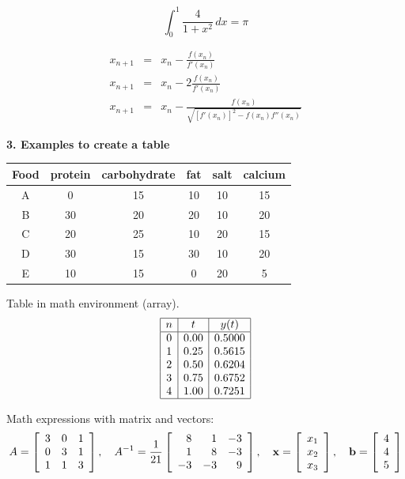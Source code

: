 \documentclass[12pt]{article}
\begin{document}
\begin{equation*}
\int_0^1 \frac{4}{1+x^2}\, dx = \pi
\end{equation*} 



\begin{eqnarray*}
x_{n+1} &= & x_n-\frac{f(x_n)}{f'(x_n)}\\
x_{n+1} &=& x_n-2\frac{f(x_n)}{f'(x_n)}\\
x_{n+1} &=& x_n-\frac{f(x_n)}{\sqrt{[f'(x_n)]^2-f(x_n)f''(x_n)}}
\end{eqnarray*}

\newpage
\noindent \textbf{3. Examples to create a table} 

\begin{center}
\begin{tabular}{|c|c|c|c|c|c|}
\hline
Food  &  protein & carbohydrate & fat & salt & calcium\\
\hline
	 A	&   0    &     15 	&     
	   10 		&    10 &    15\\
	 B	&  30    &    20   	&     	20   & 10   &  20\\
	 C	&  20    &    25    &    	10   & 20  &   15\\
	 D	&  30    &   15     &  		30    & 10 &    20\\
	 E	&  10    &  15       & 		0    & 20 &     5\\
\hline
\end{tabular}
\end{center}
\vspace{0.1in}

Table in math environment (array). 
\[
\begin{array}{|c|c|c|}
\hline
n & t & y(t)\\
\hline
0 & 0.00 & 0.5000\\
1 & 0.25 & 0.5615\\
2 & 0.50 & 0.6204\\
3 & 0.75 & 0.6752\\
4 & 1.00 & 0.7251\\
\hline
\end{array}
\]

Math expressions with matrix and vectors:
\[
A=
\left[
\begin{array}{rrr}
3&0&1\\
0&3&1\\
1&1&3
\end{array}
\right]
,\quad
A^{-1}= \frac{1}{21}\left[\begin{array}{rrr}
8 & 1 & -3 \\
1 & 8 & -3\\
-3 & -3 & 9
\end{array}\right], \quad
{\bf x}=
\left[
\begin{array}{r}
x_1\\
x_2\\
x_3
\end{array}
\right], \quad
{\bf b}=
\left[
\begin{array}{r}
4\\
4\\
5
\end{array}
\right]
\]
\end{document}
